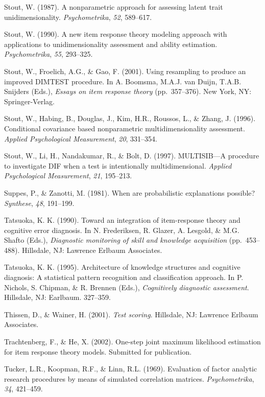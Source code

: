 \documentclass[titlepage,11pt,twoside]{article}
\begin{document}
\begin{thebibliography}
\bibitem Stout, W. (1987). A nonparametric approach for assessing latent trait unidimensionality. \textit{Psychometrika}, \textit{52}, 589--617.

\bibitem Stout, W. (1990). A new item response theory modeling approach with applications to unidimensionality assessment and ability estimation. \textit{Psychometrika}, \textit{55}, 293--325.

\bibitem Stout, W., Froelich, A.G., \& Gao, F. (2001). Using resampling to produce an improved DIMTEST procedure. In A. Boomsma, M.A.J. van Duijn, T.A.B. Snijders (Eds.), \textit{Essays on item response theory} (pp.~357--376). New York, NY: Springer-Verlag.

\bibitem Stout, W., Habing, B., Douglas, J., Kim, H.R., Roussos, L., \& Zhang, J. (1996). Conditional covariance based nonparametric multidimensionality assessment. \textit{Applied Psychological Measurement}, \textit{20}, 331--354.

\bibitem Stout, W., Li, H., Nandakumar, R., \& Bolt, D. (1997). MULTISIB---A procedure to investigate DIF when a test is intentionally multidimensional. \textit{Applied Psychological Measurement}, \textit{21}, 195--213.

\bibitem Suppes, P., \& Zanotti, M. (1981). When are probabilistic explanations possible? \textit{Synthese}, \textit{48}, 191--199.

\bibitem Tatsuoka, K. K. (1990). Toward an integration of item-response theory and cognitive error diagnosis. In N. Frederiksen, R. Glazer, A. Lesgold, \& M.G. Shafto (Eds.), \textit{Diagnostic monitoring of skill and knowledge acquisition} (pp.~453--488). Hillsdale, NJ: Lawrence Erlbaum Associates.


\bibitem Tatsuoka, K. K. (1995). Architecture of knowledge structures and cognitive diagnosis: A statistical pattern recognition and classification approach. In P. Nichols, S. Chipman, \& R. Brennen (Eds.), \textit{Cognitively diagnostic assessment}. Hillsdale, NJ: Earlbaum. 327--359.

\bibitem Thissen, D., \& Wainer, H. (2001). \textit{Test scoring}. Hillsdale, NJ: Lawrence Erlbaum Associates.

\bibitem Trachtenberg, F., \& He, X. (2002). One-step joint maximum likelihood estimation for item response theory models. Submitted for publication.

\bibitem Tucker, L.R., Koopman, R.F., \& Linn, R.L. (1969). Evaluation of factor analytic research procedures by means of simulated correlation matrices. \textit{Psychometrika}, \textit{34}, 421--459.


\end{thebibliography}
\end{document}
